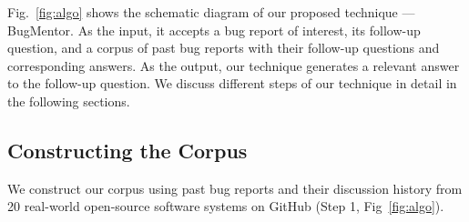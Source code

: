 \begin{figure}[htbp]
  \centering
\end{figure}

Fig.~\ref{fig:algo} shows the schematic diagram of our proposed technique --- BugMentor. As the input, it accepts a bug report of interest, its follow-up question, and a corpus of past bug reports with their follow-up questions and corresponding answers. As the output, our technique generates a relevant answer to the follow-up question. We discuss different steps of our technique in detail in the following sections.\par

\subsection{Constructing the Corpus}
\label{sec:corpus-construction}
We construct our corpus using past bug reports and their discussion history from 20 real-world open-source software systems on GitHub (Step 1, Fig~\ref{fig:algo}).\par


